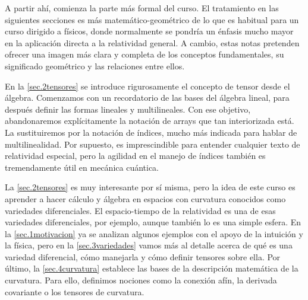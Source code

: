 A partir ahí, comienza la parte más formal del curso. El tratamiento en las siguientes secciones es más matemático-geométrico de lo que es habitual para un curso dirigido a físicos, donde normalmente se pondría un énfasis mucho mayor en la aplicación directa a la relatividad general. A cambio, estas notas pretenden ofrecer una imagen más clara y completa de los conceptos fundamentales, su significado geométrico y las relaciones entre ellos.

En la \cref{sec.2tensores} se introduce rigurosamente el concepto de tensor desde el álgebra. Comenzamos con un recordatorio de las bases del álgebra lineal, para después definir las formas lineales y multilineales. Con ese objetivo, abandonaremos explícitamente la notación de arrays que tan interiorizada está. La sustituiremos por la notación de índices, mucho más indicada para hablar de multilinealidad. Por supuesto, es imprescindible para entender cualquier texto de relatividad especial, pero la agilidad en el manejo de índices también es tremendamente útil en mecánica cuántica.

La \cref{sec.2tensores} es muy interesante por sí misma, pero la idea de este curso es aprender a hacer cálculo y álgebra en espacios con curvatura conocidos como variedades diferenciales. El espacio-tiempo de la relatividad es una de esas variedades diferenciales, por ejemplo, aunque también lo es una simple esfera. En la \cref{sec.1motivacion} ya se analizan algunos ejemplos con el apoyo de la intuición y la física, pero en la \cref{sec.3variedades} vamos más al detalle acerca de qué es una variedad diferencial, cómo manejarla y cómo definir tensores sobre ella. Por último, la \cref{sec.4curvatura} establece las bases de la descripción matemática de la curvatura. Para ello, definimos nociones como la conexión afín, la derivada covariante o los tensores de curvatura. 

